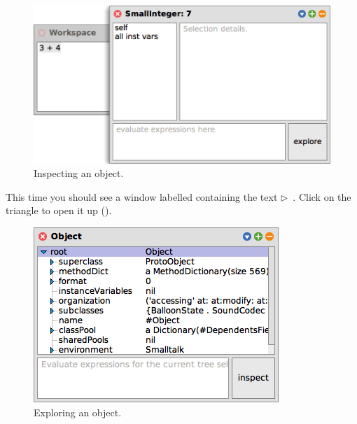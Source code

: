 \documentclass[a4paper,10pt,twoside]{book}
\begin{document}
\begin{figure}[htb]
\centerline {\includegraphics[scale=0.7]{InspectIt}}
\caption{Inspecting an object. \label{fig:inspectit}}
\end{figure}



This time you should see a window labelled  containing the text
\mbox{$\triangleright$ }.
Click on the triangle to open it up ().

\begin{figure}[htb]
\centerline {\includegraphics[scale=0.7]{ExploreIt}}
\caption{Exploring an object. \label{fig:exploreit}}
\end{figure}
\end{document}
